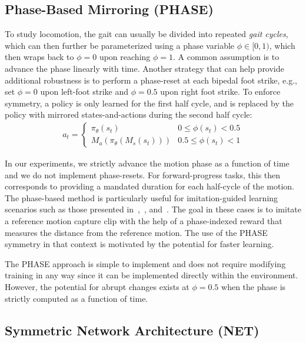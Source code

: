 \subsection{Phase-Based Mirroring (PHASE)}

To study locomotion, the gait can usually be divided into repeated \textit{gait cycles},
which can then further be parameterized using a phase variable $\phi \in [0,1)$,
which then wraps back to $\phi=0$ upon reaching $\phi=1$.
A common assumption is to advance the phase linearly with time.  
Another strategy that can help provide additional robustness is to perform a
phase-reset at each bipedal foot strike, e.g., set $\phi=0$ upon left-foot strike
and $\phi=0.5$ upon right foot strike. 
To enforce symmetry, a policy is only learned for the first half cycle, 
and is replaced by the policy with mirrored states-and-actions during the second half cycle:
\begin{align}
    a_t = \begin{cases}
    \pi_\theta(s_t) & 0 \leq \phi(s_t) < 0.5\\
    M_a(\pi_\theta(M_s(s_t))) & 0.5 \leq \phi(s_t) < 1
    \end{cases}
    \label{eq:phase-based-symmetry}
\end{align}

In our experiments, we strictly advance the motion phase as a function
of time and we do not implement phase-resets.  For forward-progress tasks,
this then corresponds to providing a mandated duration for each half-cycle of the motion.
The phase-based method is particularly useful for imitation-guided learning scenarios
such as those presented in~\cite{2017-TOG-deepLoco},~\cite{2018-TOG-deepMimic},
and~\cite{cassie-sim-to-real}.
The goal in these cases is to imitate a reference motion capture clip with 
the help of a phase-indexed reward that measures the distance from the reference motion.
The use of the PHASE symmetry in that context is motivated by the potential
for faster learning.

The PHASE approach is simple to implement and does not require modifying training in any way 
since it can be implemented directly within the environment. 
However, the potential for abrupt changes exists at $\phi=0.5$ when the 
phase is strictly computed as a function of time.

\subsection{Symmetric Network Architecture (NET)}

